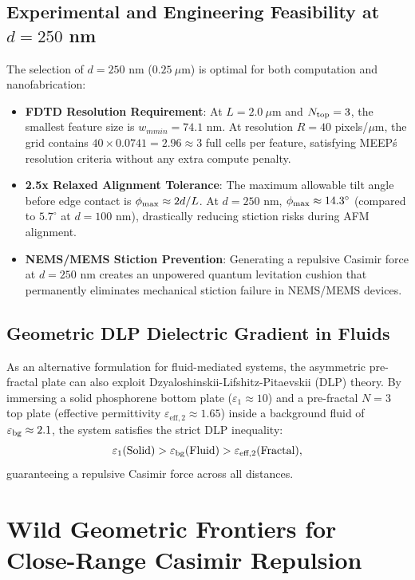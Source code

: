 \documentclass[12pt,letterpaper]{article}
\begin{document}
\subsection{Experimental and Engineering Feasibility at $d = 250$ nm}
The selection of $d = 250$ nm ($0.25\ \mu\text{m}$) is optimal for both computation and nanofabrication:
\begin{itemize}
    \item \textbf{FDTD Resolution Requirement}: At $L = 2.0\ \mu\text{m}$ and $N_{\rm top} = 3$, the smallest feature size is $w_{
m min} = 74.1$ nm. At resolution $R = 40$ pixels/$\mu\text{m}$, the grid contains $40 \times 0.0741 = 2.96 \approx 3$ full cells per feature, satisfying MEEP\'s resolution criteria without any extra compute penalty.
    \item \textbf{2.5x Relaxed Alignment Tolerance}: The maximum allowable tilt angle before edge contact is $\phi_{\rm max} \approx 2d/L$. At $d = 250$ nm, $\phi_{\rm max} \approx 14.3^\circ$ (compared to $5.7^\circ$ at $d=100$ nm), drastically reducing stiction risks during AFM alignment.
    \item \textbf{NEMS/MEMS Stiction Prevention}: Generating a repulsive Casimir force at $d = 250$ nm creates an unpowered quantum levitation cushion that permanently eliminates mechanical stiction failure in NEMS/MEMS devices.
\end{itemize}

\subsection{Geometric DLP Dielectric Gradient in Fluids}
As an alternative formulation for fluid-mediated systems, the asymmetric pre-fractal plate can also exploit Dzyaloshinskii-Lifshitz-Pitaevskii (DLP) theory. By immersing a solid phosphorene bottom plate ($\varepsilon_1 \approx 10$) and a pre-fractal $N=3$ top plate (effective permittivity $\varepsilon_{\text{eff}, 2} \approx 1.65$) inside a background fluid of $\varepsilon_{\rm bg} \approx 2.1$, the system satisfies the strict DLP inequality:
\begin{equation}
\varepsilon_1 (\text{Solid}) > \varepsilon_{\rm bg} (\text{Fluid}) > \varepsilon_{\text{eff}, 2} (\text{Fractal}),
\end{equation}
guaranteeing a repulsive Casimir force across all distances.


\section{Wild Geometric Frontiers for Close-Range Casimir Repulsion}
\label{sec:wild_frontiers}
\end{document}
